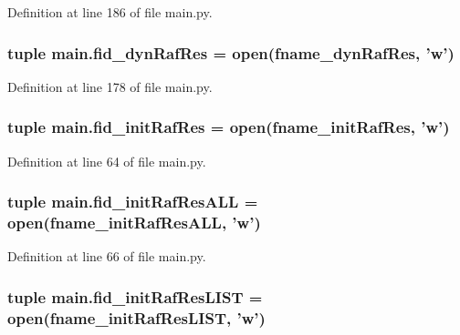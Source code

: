 Definition at line 186 of file main.\-py.

\hypertarget{a00151_aaff6b4fb4c2e2089c2a207a12f1757e3}{
\subsubsection[{fid\-\_\-dyn\-Raf\-Res}]{\setlength{\rightskip}{0pt plus 5cm}tuple main.\-fid\-\_\-dyn\-Raf\-Res = open({\bf fname\-\_\-dyn\-Raf\-Res}, 'w')}}\label{a00151_aaff6b4fb4c2e2089c2a207a12f1757e3}


Definition at line 178 of file main.\-py.

\hypertarget{a00151_a98d514a663f6bedde329d0bbbd2b78fa}{
\subsubsection[{fid\-\_\-init\-Raf\-Res}]{\setlength{\rightskip}{0pt plus 5cm}tuple main.\-fid\-\_\-init\-Raf\-Res = open({\bf fname\-\_\-init\-Raf\-Res}, 'w')}}\label{a00151_a98d514a663f6bedde329d0bbbd2b78fa}


Definition at line 64 of file main.\-py.

\hypertarget{a00151_a45aeb03f0d9cc30cb0a490354fd76d6c}{
\subsubsection[{fid\-\_\-init\-Raf\-Res\-A\-L\-L}]{\setlength{\rightskip}{0pt plus 5cm}tuple main.\-fid\-\_\-init\-Raf\-Res\-A\-L\-L = open({\bf fname\-\_\-init\-Raf\-Res\-A\-L\-L}, 'w')}}\label{a00151_a45aeb03f0d9cc30cb0a490354fd76d6c}


Definition at line 66 of file main.\-py.

\hypertarget{a00151_ae24c607a37f0f3f23d7e87f6bb4fe45b}{
\subsubsection[{fid\-\_\-init\-Raf\-Res\-L\-I\-S\-T}]{\setlength{\rightskip}{0pt plus 5cm}tuple main.\-fid\-\_\-init\-Raf\-Res\-L\-I\-S\-T = open({\bf fname\-\_\-init\-Raf\-Res\-L\-I\-S\-T}, 'w')}}\label{a00151_ae24c607a37f0f3f23d7e87f6bb4fe45b}


